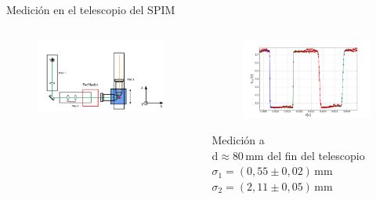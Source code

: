     \begin{frame}{Medición en el telescopio del SPIM}
       \begin{columns}[c]
        \begin{column}{0.5\textwidth}
            \begin{figure}[H]
                \centering
                \includegraphics[width=\textwidth]{fig/perfilador/spim_lightsheet_perfilador}
                \label{fig:spim_lightsheet_perfilador}
            \end{figure}
        \end{column}
        \begin{column}{0.5\textwidth}
            \vspace{-3em}
            \begin{figure}[H]
                \centering
                \includegraphics[width=\textwidth]{fig/perfilador/spim_lightsheet}
                \label{fig:spim_lightsheet}
            \end{figure}
            \vspace{-1em}
            Medición a \\d$\approx$80$\,$mm del fin del telescopio
            $\sigma_1 = (0,55 \pm 0,02)\,\text{mm}$\\
            $\sigma_2 = (2,11 \pm 0,05)\,\text{mm}$\\
            \end{column}
        \end{columns}
        \vspace{1em}

    \end{frame}
